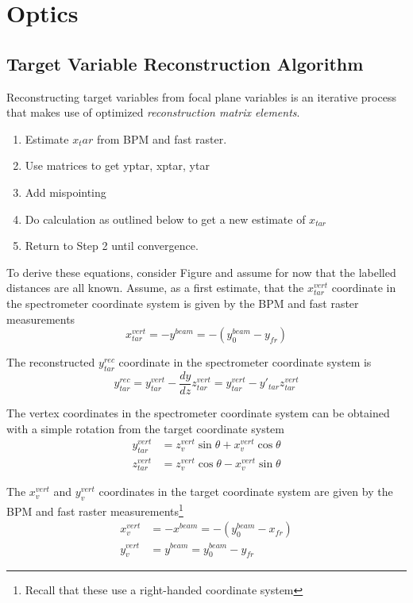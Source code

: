 \section{Optics}

\subsection{Target Variable Reconstruction Algorithm}
Reconstructing target variables from focal plane variables is an iterative
process that makes use of optimized \textit{reconstruction matrix elements}.

\begin{enumerate}
    \item Estimate $x_tar$ from BPM and fast raster.
    \item Use matrices to get yptar, xptar, ytar
    \item Add mispointing
    \item Do calculation as outlined below to get a new estimate of $x_{tar}$
    \item Return to Step 2 until convergence.
\end{enumerate}

To derive these equations, consider Figure and assume for now that the
labelled distances are all known.
Assume, as a first estimate, that the $x^{vert}_{tar}$ coordinate in the
spectrometer coordinate system is given by the BPM and fast raster measurements
\begin{equation}
x^{vert}_{tar} = -y^{beam} = -(y_0^{beam} - y_{fr})
\end{equation}

The reconstructed $y^{rec}_{tar}$ coordinate in the spectrometer coordinate
system is
\begin{equation} \label{eqn:yrectar}
y^{rec}_{tar} = y^{vert}_{tar} - \frac{dy}{dz} z^{vert}_{tar}
              = y^{vert}_{tar} - y'_{tar} z^{vert}_{tar}
\end{equation}

The vertex coordinates in the spectrometer coordinate system can be obtained
with a simple rotation from the target coordinate system
\begin{align} \label{eqn:yzverttar}
y^{vert}_{tar} &= z^{vert}_v \sin\theta + x^{vert}_v \cos\theta \\
z^{vert}_{tar} &= z^{vert}_v \cos\theta - x^{vert}_v \sin\theta
\end{align}

The $x^{vert}_{v}$ and $y^{vert}_{v}$ coordinates in the
target coordinate system are given by the BPM and fast raster
measurements\footnote{Recall that these use a right-handed coordinate system}
\begin{align}
x^{vert}_v &= -x^{beam} = -(y_0^{beam} - x_{fr}) \\
y^{vert}_v &= y^{beam} = y_0^{beam} - y_{fr}
\end{align}

